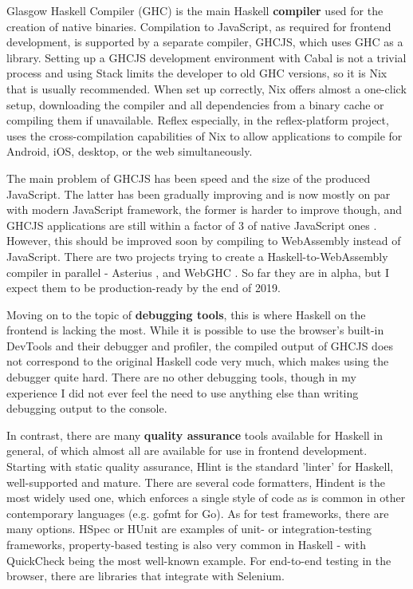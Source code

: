 \documentclass[english,odsaz]{fitthesis}
\begin{document}
Glasgow Haskell Compiler (GHC) is the main Haskell \textbf{compiler} used for the
creation of native binaries. Compilation to JavaScript, as required for frontend
development, is supported by a separate compiler, GHCJS, which uses GHC as a
library. Setting up a GHCJS development environment with Cabal is not a trivial
process and using Stack limits the developer to old GHC versions, so it is Nix
that is usually recommended. When set up correctly, Nix offers almost a
one-click setup, downloading the compiler and all dependencies from a binary
cache or compiling them if unavailable. Reflex especially, in the
reflex-platform \cite{reflex-platform} project, uses the cross-compilation
capabilities of Nix to allow applications to compile for Android, iOS, desktop,
or the web simultaneously.

The main problem of GHCJS has been speed and the size of the produced
JavaScript. The latter has been gradually improving and is now mostly on par
with modern JavaScript framework, the former is harder to improve though, and
GHCJS applications are still within a factor of 3 of native JavaScript ones
\cite{nanda_bench}. However, this should be improved soon by compiling to
WebAssembly instead of JavaScript. There are two projects trying to create a
Haskell-to-WebAssembly compiler in parallel - Asterius \cite{asterius}, and WebGHC
\cite{webghc}. So far they are in alpha, but I expect them to be production-ready
by the end of 2019.

Moving on to the topic of \textbf{debugging tools}, this is where Haskell on the frontend
is lacking the most. While it is possible to use the browser's built-in DevTools
and their debugger and profiler, the compiled output of GHCJS does not
correspond to the original Haskell code very much, which makes using the
debugger quite hard. There are no other debugging tools, though in my experience
I did not ever feel the need to use anything else than writing debugging output
to the console.

In contrast, there are many \textbf{quality assurance} tools available for Haskell in
general, of which almost all are available for use in frontend
development. Starting with static quality assurance, Hlint is the standard
'linter' for Haskell, well-supported and mature. There are several code
formatters, Hindent is the most widely used one, which enforces a single style
of code as is common in other contemporary languages (e.g. gofmt for Go).  As
for test frameworks, there are many options. HSpec or HUnit are examples of
unit- or integration-testing frameworks, property-based testing is also very
common in Haskell - with QuickCheck \cite{claessen2011quickcheck} being the most
well-known example. For end-to-end testing in the browser, there are libraries
that integrate with Selenium.
\end{document}
